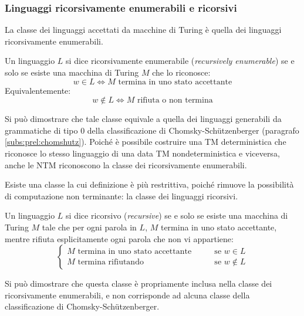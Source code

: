 \subsubsection{Linguaggi ricorsivamente enumerabili e ricorsivi}
La classe dei linguaggi accettati da macchine di Turing è quella dei linguaggi ricorsivamente enumerabili.
\begin{defin}
	Un linguaggio $L$ si dice ricorsivamente enumerabile (\emph{recursively enumerable}) se e solo se esiste una macchina di Turing $M$ che lo riconosce:
	\begin{equation*}
		w\in L \iff M \text{ termina in uno stato accettante}
	\end{equation*}
	Equivalentemente:
	\begin{equation*}
		w\notin L \iff M \text{ rifiuta o non termina}
	\end{equation*}
\end{defin}
Si può dimostrare che tale classe equivale a quella dei linguaggi generabili da grammatiche di tipo 0 della classificazione di Chomsky-Schützenberger (paragrafo \ref{subs:prel:chomshutz}). Poiché è possibile costruire una TM deterministica che riconosce lo stesso linguaggio di una data TM nondeterministica e viceversa, anche le NTM riconoscono la classe dei ricorsivamente enumerabili.

Esiste una classe la cui definizione è più restrittiva, poiché rimuove la possibilità di computazione non terminante: la classe dei linguaggi ricorsivi.
\begin{defin}
	Un linguaggio $L$ si dice ricorsivo (\emph{recursive}) se e solo se esiste una macchina di Turing $M$ tale che per ogni parola in $L$, $M$ termina in uno stato accettante, mentre rifiuta esplicitamente ogni parola che non vi appartiene:
	\begin{equation*}
		\begin{cases}
			\text{$M$ termina in uno stato accettante} \qquad & \text{se } w\in L    \\
			\text{$M$ termina rifiutando} \qquad              & \text{se } w\notin L
		\end{cases}
	\end{equation*}
\end{defin}
Si può dimostrare che questa classe è propriamente inclusa nella classe dei ricorsivamente enumerabili, e non corrisponde ad alcuna classe della classificazione di Chomsky-Schützenberger.



